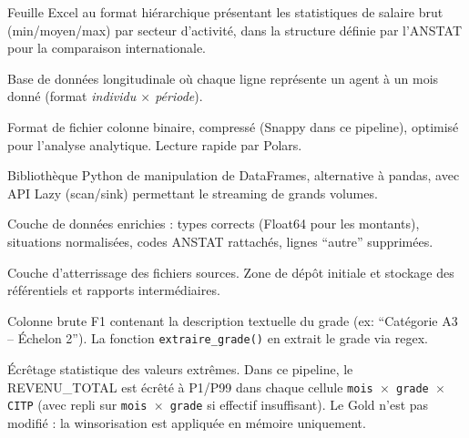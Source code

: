\documentclass[12pt,a4paper,french]{report}
\begin{document}
\begin{description}[leftmargin=3cm, labelwidth=2.8cm, style=nextline]
  \item[MODELE\_ANSTAT] Feuille Excel au format hiérarchique présentant les
  statistiques de salaire brut (min/moyen/max) par secteur d'activité, dans
  la structure définie par l'ANSTAT pour la comparaison internationale.

  \item[Panel] Base de données longitudinale où chaque ligne représente un
  agent à un mois donné (format \textit{individu $\times$ période}).

  \item[Parquet] Format de fichier colonne binaire, compressé (Snappy dans ce
  pipeline), optimisé pour l'analyse analytique. Lecture rapide par Polars.

  \item[Polars] Bibliothèque Python de manipulation de DataFrames, alternative
  à pandas, avec API Lazy (scan/sink) permettant le streaming de grands
  volumes.

  \item[Silver] Couche de données enrichies : types corrects (Float64 pour les
  montants), situations normalisées, codes ANSTAT rattachés, lignes
  ``autre'' supprimées.

  \item[Staging] Couche d'atterrissage des fichiers sources. Zone de dépôt
  initiale et stockage des référentiels et rapports intermédiaires.

  \item[statut\_fonctionnaire] Colonne brute F1 contenant la description
  textuelle du grade (ex: ``Catégorie A3 -- Échelon 2''). La fonction
  \texttt{extraire\_grade()} en extrait le grade via regex.

  \item[Winsorisation] Écrêtage statistique des valeurs extrêmes. Dans ce
  pipeline, le REVENU\_TOTAL est écrêté à P1/P99 dans chaque cellule
  \texttt{mois $\times$ grade $\times$ CITP} (avec repli sur
  \texttt{mois $\times$ grade} si effectif insuffisant). Le Gold n'est pas
  modifié : la winsorisation est appliquée en mémoire uniquement.

\end{description}
\end{document}
